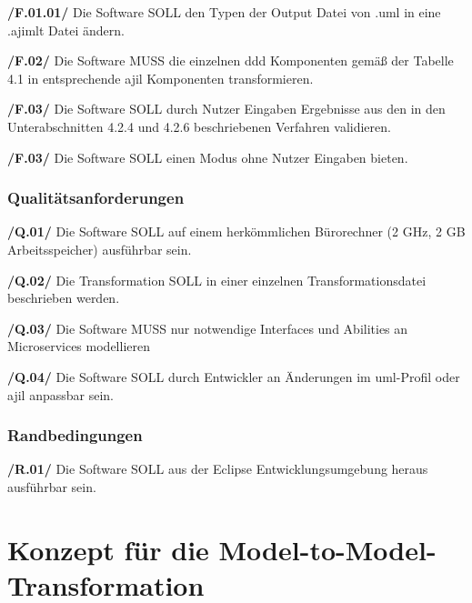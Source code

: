 \documentclass[
	oneside,  %
	ngerman, 
	final, 
	11pt, 
	a4paper, 
	1.1headlines, 
	headinclude=false, 
	footinclude=false, 
	mpinclude=false, 
	pagesize, 
	onecolumn, 
	titlepage, 
	parskip=half, 
	headsepline, 
	chapterprefix=false, 
	version=first, 
	listof=totoc, 
	bibliography=totoc, 
	toc=graduated, 
	fleqn
]{scrbook}
\begin{document}
\textbf{/F.01.01/} Die Software SOLL den Typen der Output Datei von .uml in eine .ajimlt Datei ändern.

\textbf{/F.02/} Die Software MUSS die einzelnen \ac{ddd} Komponenten gemäß der Tabelle 4.1 in entsprechende \ac{ajil} Komponenten transformieren.

\textbf{/F.03/} Die Software SOLL durch Nutzer Eingaben Ergebnisse aus den in den Unterabschnitten 4.2.4 und 4.2.6 beschriebenen Verfahren validieren.

\textbf{/F.03/} Die Software SOLL einen Modus ohne Nutzer Eingaben bieten.

\subsection{Qualitätsanforderungen}
\textbf{/Q.01/} Die Software SOLL auf einem herkömmlichen Bürorechner (2 GHz, 2 GB Arbeitsspeicher) ausführbar sein.

\textbf{/Q.02/} Die Transformation SOLL in einer einzelnen Transformationsdatei beschrieben werden.

\textbf{/Q.03/} Die Software MUSS nur notwendige Interfaces und Abilities an Microservices modellieren

\textbf{/Q.04/} Die Software SOLL durch Entwickler an Änderungen im \ac{uml}-Profil oder \ac{ajil} anpassbar sein.
\subsection{Randbedingungen}
\textbf{/R.01/} Die Software SOLL aus der Eclipse Entwicklungsumgebung heraus ausführbar sein.

\chapter{Konzept für die Model-to-Model-Transformation}
\end{document}
